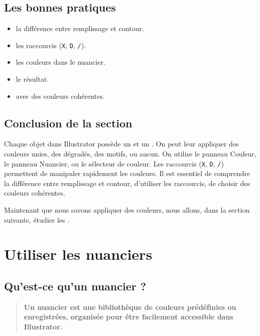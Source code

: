\subsection{Les bonnes pratiques}

\begin{itemize}
    \item {} la différence entre remplissage et contour.
    \item {} les raccourcis (\texttt{X}, \texttt{D}, \texttt{/}).
    \item {} les couleurs dans le nuancier.
    \item {} le résultat.
    \item {} avec des couleurs cohérentes.
\end{itemize}

\subsection*{Conclusion de la section}

Chaque objet dans Illustrator possède un  et un . On peut leur appliquer des couleurs unies, des dégradés, des motifs, ou aucun. On utilise le panneau Couleur, le panneau Nuancier, ou le sélecteur de couleur. Les raccourcis (\texttt{X}, \texttt{D}, \texttt{/}) permettent de manipuler rapidement les couleurs. Il est essentiel de comprendre la différence entre remplissage et contour, d'utiliser les raccourcis, de choisir des couleurs cohérentes.

Maintenant que nous savons appliquer des couleurs, nous allons, dans la section suivante, étudier les .

\section{Utiliser les nuanciers}

\subsection{Qu'est-ce qu'un nuancier ?}

\begin{quote}
\textbf{Un nuancier est une bibliothèque de couleurs prédéfinies ou enregistrées, organisée pour être facilement accessible dans Illustrator.}
\end{quote}

